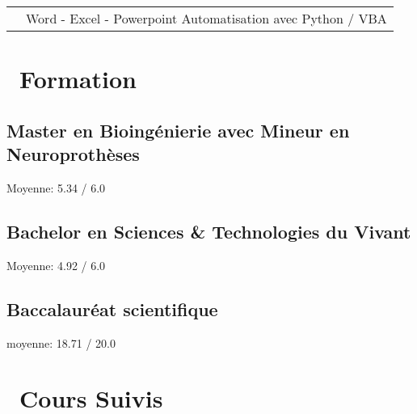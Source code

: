 \documentclass[a4paper]{cv}
\begin{document}
\begin{minipage}[t]{0.6\textwidth}
\begin{tabular}{R{0.21\textwidth} L{0.7\textwidth}}
 & Word - Excel - Powerpoint \tbl{} Automatisation avec Python / VBA\\

\end{tabular}

\vspace{5pt}

\end{minipage}
\hsepcol
\begin{minipage}[t]{0.33\textwidth}

\section{\texorpdfstring{\faGraduationCap} \ \ Formation}\sectionline

\subsection{Master en Bioingénierie avec Mineur en Neuroprothèses}
Moyenne: 5.34 / 6.0
\sectionspace

\subsection{Bachelor en Sciences \& Technologies du Vivant}
Moyenne: 4.92 / 6.0
\sectionspace

\subsection{Baccalauréat scientifique}
moyenne: 18.71 / 20.0
\sectionspace

\section{\texorpdfstring{\faBook} \ \ Cours Suivis}\sectionline


\end{minipage}
\end{document}
